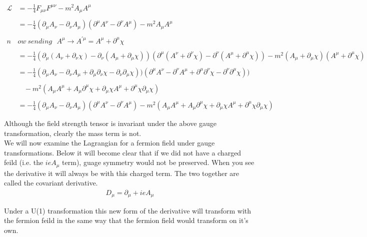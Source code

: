 \documentclass[aps,secnumarabic,nobalancelastpage,amsmath,amssymb,
nofootinbib]{revtex4}
\newcommand{\Lagr}{\mathcal{L}}
\begin{document}
\begin{equation}
\begin{aligned}
\Lagr &= -\frac{1}{4} F_{\mu\nu}F^{\mu\nu} - m^2 A_\mu A^\mu\\
\\
&=-\frac{1}{4} (\partial_\mu A_\nu - \partial_\nu A_\mu)(\partial^\mu A^\nu-\partial^\nu A^\mu) - m^2 A_\mu A^\mu\\
\\
n&ow \  sending \ \ \ A^\mu \rightarrow A^{'\mu} = A^\mu + \partial^\mu \chi \\
\\ &=-\frac{1}{4} (\partial_\mu (A_\nu + \partial_\nu \chi) - \partial_\nu (A_\mu + \partial_\mu \chi))(\partial^\mu (A^\nu + \partial^\nu \chi)-\partial^\nu (A^\mu + \partial^\mu \chi)) - m^2 (A_\mu + \partial_\mu \chi) (A^\mu + \partial^\mu \chi)\\
\\
&=-\frac{1}{4} (\partial_\mu A_\nu - \partial_\nu A_\mu + \partial_\mu \partial_\nu \chi - \partial_\nu \partial_\mu \chi))(\partial^\mu A^\nu -\partial^\nu A^\mu +\partial^\mu \partial^\nu \chi - \partial^\nu \partial^\mu \chi)) \\\\
&\ \ \ \ - m^2 (A_\mu A^\mu + A_\mu \partial^\mu \chi +\partial_\mu \chi A^\mu +\partial^\mu \chi \partial_\mu \chi)\\
\\
&=-\frac{1}{4} (\partial_\mu A_\nu - \partial_\nu A_\mu)(\partial^\mu A^\nu-\partial^\nu A^\mu)- m^2 (A_\mu A^\mu + A_\mu \partial^\mu \chi +\partial_\mu \chi A^\mu +\partial^\mu \chi \partial_\mu \chi)\\\\
\end{aligned}
\end{equation}
Although the field strength tensor is invariant under the above gauge  transformation, clearly the mass term is not.\\


We will now examine the Lagrangian for a fermion field under gauge transformations. Below it will become clear that if we did not have a charged feild (i.e. the $i e A_\mu$ term), guage symmetry would not be preserved. When you see the derivative it will always be with this charged term. The two together are called the covariant derivative.\\
\begin{equation}
\begin{split}
D_\mu = \partial_\mu + i e A_\mu\\\\
\end{split}
\end{equation}
 Under a U(1) transformation this new form of the derivative will transform with the fermion feild in the same way that the fermion field would transform on it's own.
\end{document}
